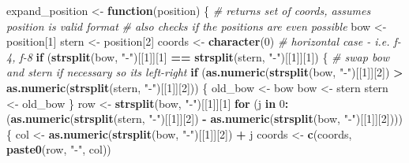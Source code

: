 \documentclass[
]{article}
\newenvironment{Shaded}{\begin{snugshade}}{\end{snugshade}}
\newcommand{\CommentTok}[1]{\textcolor[rgb]{0.56,0.35,0.01}{\textit{#1}}}
\newcommand{\ControlFlowTok}[1]{\textcolor[rgb]{0.13,0.29,0.53}{\textbf{#1}}}
\newcommand{\DecValTok}[1]{\textcolor[rgb]{0.00,0.00,0.81}{#1}}
\newcommand{\FunctionTok}[1]{\textcolor[rgb]{0.13,0.29,0.53}{\textbf{#1}}}
\newcommand{\NormalTok}[1]{#1}
\newcommand{\OtherTok}[1]{\textcolor[rgb]{0.56,0.35,0.01}{#1}}
\newcommand{\SpecialCharTok}[1]{\textcolor[rgb]{0.81,0.36,0.00}{\textbf{#1}}}
\newcommand{\StringTok}[1]{\textcolor[rgb]{0.31,0.60,0.02}{#1}}
\begin{document}
\begin{Shaded}
\begin{Highlighting}[]
\NormalTok{expand\_position }\OtherTok{\textless{}{-}} \ControlFlowTok{function}\NormalTok{(position) \{ }\CommentTok{\# returns set of coords, assumes position is valid format}
  \CommentTok{\# also checks if the positions are even possible}
\NormalTok{  bow }\OtherTok{\textless{}{-}}\NormalTok{ position[}\DecValTok{1}\NormalTok{]}
\NormalTok{  stern }\OtherTok{\textless{}{-}}\NormalTok{ position[}\DecValTok{2}\NormalTok{]}
\NormalTok{  coords }\OtherTok{\textless{}{-}} \FunctionTok{character}\NormalTok{(}\DecValTok{0}\NormalTok{)}
  \CommentTok{\# horizontal case {-} i.e. f{-}4, f{-}8}
  \ControlFlowTok{if}\NormalTok{ (}\FunctionTok{strsplit}\NormalTok{(bow, }\StringTok{"{-}"}\NormalTok{)[[}\DecValTok{1}\NormalTok{]][}\DecValTok{1}\NormalTok{] }\SpecialCharTok{==} \FunctionTok{strsplit}\NormalTok{(stern, }\StringTok{"{-}"}\NormalTok{)[[}\DecValTok{1}\NormalTok{]][}\DecValTok{1}\NormalTok{]) \{}
    \CommentTok{\# swap bow and stern if necessary so it\textquotesingle{}s left{-}right}
    \ControlFlowTok{if}\NormalTok{ (}\FunctionTok{as.numeric}\NormalTok{(}\FunctionTok{strsplit}\NormalTok{(bow, }\StringTok{"{-}"}\NormalTok{)[[}\DecValTok{1}\NormalTok{]][}\DecValTok{2}\NormalTok{]) }\SpecialCharTok{\textgreater{}} \FunctionTok{as.numeric}\NormalTok{(}\FunctionTok{strsplit}\NormalTok{(stern, }\StringTok{"{-}"}\NormalTok{)[[}\DecValTok{1}\NormalTok{]][}\DecValTok{2}\NormalTok{])) \{}
\NormalTok{      old\_bow }\OtherTok{\textless{}{-}}\NormalTok{ bow}
\NormalTok{      bow }\OtherTok{\textless{}{-}}\NormalTok{ stern}
\NormalTok{      stern }\OtherTok{\textless{}{-}}\NormalTok{ old\_bow}
\NormalTok{    \}}
\NormalTok{    row }\OtherTok{\textless{}{-}} \FunctionTok{strsplit}\NormalTok{(bow, }\StringTok{"{-}"}\NormalTok{)[[}\DecValTok{1}\NormalTok{]][}\DecValTok{1}\NormalTok{]}
    \ControlFlowTok{for}\NormalTok{ (j }\ControlFlowTok{in} \DecValTok{0}\SpecialCharTok{:}\NormalTok{(}\FunctionTok{as.numeric}\NormalTok{(}\FunctionTok{strsplit}\NormalTok{(stern, }\StringTok{"{-}"}\NormalTok{)[[}\DecValTok{1}\NormalTok{]][}\DecValTok{2}\NormalTok{]) }\SpecialCharTok{{-}} \FunctionTok{as.numeric}\NormalTok{(}\FunctionTok{strsplit}\NormalTok{(bow, }\StringTok{"{-}"}\NormalTok{)[[}\DecValTok{1}\NormalTok{]][}\DecValTok{2}\NormalTok{]))) \{}
\NormalTok{      col }\OtherTok{\textless{}{-}} \FunctionTok{as.numeric}\NormalTok{(}\FunctionTok{strsplit}\NormalTok{(bow, }\StringTok{"{-}"}\NormalTok{)[[}\DecValTok{1}\NormalTok{]][}\DecValTok{2}\NormalTok{]) }\SpecialCharTok{+}\NormalTok{ j}
\NormalTok{      coords }\OtherTok{\textless{}{-}} \FunctionTok{c}\NormalTok{(coords, }\FunctionTok{paste0}\NormalTok{(row, }\StringTok{"{-}"}\NormalTok{, col))}

\end{Highlighting}
\end{Shaded}
\end{document}
